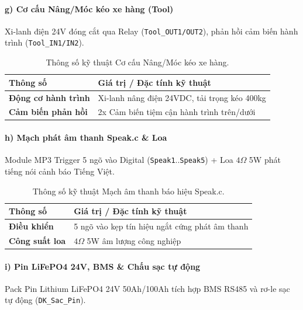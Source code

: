 \documentclass{article}
\begin{document}
\paragraph{g) Cơ cấu Nâng/Móc kéo xe hàng (Tool)}
Xi-lanh điện 24V đóng cắt qua Relay (\texttt{Tool\_OUT1/OUT2}), phản hồi cảm biến hành trình (\texttt{Tool\_IN1/IN2}).

\begin{table}[!htbp]
\centering
\begin{tabularx}{\textwidth}{|>{\bfseries}l|X|}
\hline
\rowcolor{lightgray} Thông số & Giá trị / Đặc tính kỹ thuật \\ \hline
Động cơ hành trình & Xi-lanh nâng điện 24VDC, tải trọng kéo 400kg \\ \hline
Cảm biến phản hồi & 2x Cảm biến tiệm cận hành trình trên/dưới \\ \hline
\end{tabularx}
\caption{Thông số kỹ thuật Cơ cấu Nâng/Móc kéo xe hàng.}
\label{tab:spec_tool}
\end{table}

\paragraph{h) Mạch phát âm thanh Speak.c \& Loa}
Module MP3 Trigger 5 ngõ vào Digital (\texttt{Speak1}..\texttt{Speak5}) + Loa $4\Omega$ 5W phát tiếng nói cảnh báo Tiếng Việt.

\begin{table}[!htbp]
\centering
\begin{tabularx}{\textwidth}{|>{\bfseries}l|X|}
\hline
\rowcolor{lightgray} Thông số & Giá trị / Đặc tính kỹ thuật \\ \hline
Điều khiển & 5 ngõ vào kẹp tín hiệu ngắt cứng phát âm thanh \\ \hline
Công suất loa & $4\Omega$ 5W âm lượng công nghiệp \\ \hline
\end{tabularx}
\caption{Thông số kỹ thuật Mạch âm thanh báo hiệu Speak.c.}
\label{tab:spec_speak}
\end{table}

\paragraph{i) Pin LiFePO4 24V, BMS \& Chấu sạc tự động}
Pack Pin Lithium LiFePO4 24V 50Ah/100Ah tích hợp BMS RS485 và rơ-le sạc tự động (\texttt{DK\_Sac\_Pin}).
\end{document}

